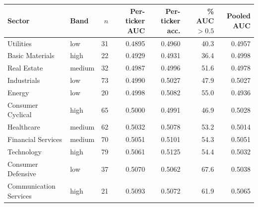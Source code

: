 \begin{tabular}{llrrrrr}
\toprule
Sector & Band & $n$ & Per-ticker AUC & Per-ticker acc. & \% AUC $>0.5$ & Pooled AUC \\
\midrule
Utilities & low & 31 & 0.4895 & 0.4960 & 40.3 & 0.4957 \\
Basic Materials & high & 22 & 0.4929 & 0.4931 & 36.4 & 0.4998 \\
Real Estate & medium & 32 & 0.4987 & 0.4996 & 51.6 & 0.4978 \\
Industrials & low & 73 & 0.4990 & 0.5027 & 47.9 & 0.5027 \\
Energy & low & 20 & 0.4998 & 0.5082 & 55.0 & 0.4936 \\
Consumer Cyclical & high & 65 & 0.5000 & 0.4991 & 46.9 & 0.5028 \\
Healthcare & medium & 62 & 0.5032 & 0.5078 & 53.2 & 0.5014 \\
Financial Services & medium & 70 & 0.5051 & 0.5101 & 54.3 & 0.5051 \\
Technology & high & 79 & 0.5061 & 0.5125 & 54.4 & 0.5032 \\
Consumer Defensive & low & 37 & 0.5070 & 0.5062 & 67.6 & 0.5038 \\
Communication Services & high & 21 & 0.5093 & 0.5072 & 61.9 & 0.5065 \\
\bottomrule
\end{tabular}
